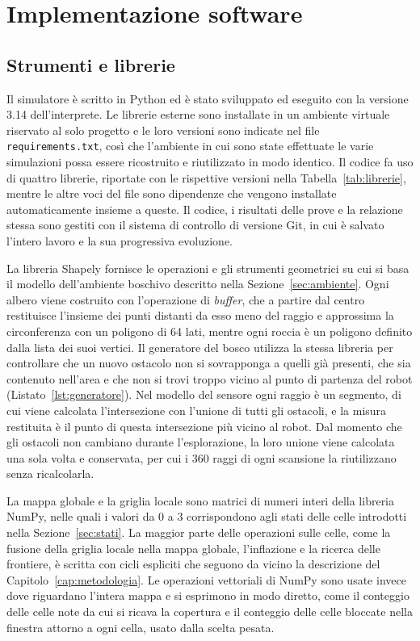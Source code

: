 \chapter{Implementazione software}
\label{cap:implementazione}

\section{Strumenti e librerie}
\label{sec:strumenti}

Il simulatore è scritto in Python ed è stato sviluppato ed eseguito con la versione 3.14 dell'interprete. Le librerie esterne sono installate in un ambiente virtuale riservato al solo progetto e le loro versioni sono indicate nel file \texttt{requirements.txt}, così che l'ambiente in cui sono state effettuate le varie simulazioni possa essere ricostruito e riutilizzato in modo identico. Il codice fa uso di quattro librerie, riportate con le rispettive versioni nella Tabella~\ref{tab:librerie}, mentre le altre voci del file sono dipendenze che vengono installate automaticamente insieme a queste. Il codice, i risultati delle prove e la relazione stessa sono gestiti con il sistema di controllo di versione Git, in cui è salvato l'intero lavoro e la sua progressiva evoluzione.

La libreria Shapely fornisce le operazioni e gli strumenti geometrici su cui si basa il modello dell'ambiente boschivo descritto nella Sezione~\ref{sec:ambiente}. Ogni albero viene costruito con l'operazione di \emph{buffer}, che a partire dal centro restituisce l'insieme dei punti distanti da esso meno del raggio e approssima la circonferenza con un poligono di 64 lati, mentre ogni roccia è un poligono definito dalla lista dei suoi vertici. Il generatore del bosco utilizza la stessa libreria per controllare che un nuovo ostacolo non si sovrapponga a quelli già presenti, che sia contenuto nell'area e che non si trovi troppo vicino al punto di partenza del robot (Listato~\ref{lst:generatore}). Nel modello del sensore ogni raggio è un segmento, di cui viene calcolata l'intersezione con l'unione di tutti gli ostacoli, e la misura restituita è il punto di questa intersezione più vicino al robot. Dal momento che gli ostacoli non cambiano durante l'esplorazione, la loro unione viene calcolata una sola volta e conservata, per cui i 360 raggi di ogni scansione la riutilizzano senza ricalcolarla.

La mappa globale e la griglia locale sono matrici di numeri interi della libreria NumPy, nelle quali i valori da 0 a 3 corrispondono agli stati delle celle introdotti nella Sezione~\ref{sec:stati}. La maggior parte delle operazioni sulle celle, come la fusione della griglia locale nella mappa globale, l'inflazione e la ricerca delle frontiere, è scritta con cicli espliciti che seguono da vicino la descrizione del Capitolo~\ref{cap:metodologia}. Le operazioni vettoriali di NumPy sono usate invece dove riguardano l'intera mappa e si esprimono in modo diretto, come il conteggio delle celle note da cui si ricava la copertura e il conteggio delle celle bloccate nella finestra attorno a ogni cella, usato dalla scelta pesata.

